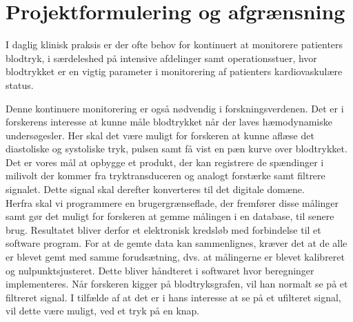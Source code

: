 \chapter{Projektformulering og afgrænsning}
I daglig klinisk praksis er der ofte behov for kontinuert at monitorere patienters blodtryk, i særdeleshed på intensive afdelinger samt operationsstuer, hvor blodtrykket er en vigtig parameter i monitorering af patienters kardiovaskulære status.


Denne kontinuere monitorering er også nødvendig i forskningsverdenen. Det er i forskerens interesse at kunne måle blodtrykket når der laves hæmodynamiske undersøgesler. Her skal det være muligt for forskeren at kunne aflæse det diastoliske og systoliske tryk, pulsen samt få vist en pæn kurve over blodtrykket. Det er vores mål at opbygge et produkt, der kan registrere de spændinger i milivolt der kommer fra tryktransduceren og analogt forstærke samt filtrere signalet. Dette signal skal derefter konverteres til det digitale domæne. \\
Herfra skal vi programmere en brugergrænseflade, der fremfører disse målinger samt gør det muligt for forskeren at gemme målingen i en database, til senere brug. Resultatet bliver derfor et elektronisk kredsløb med forbindelse til et software program.
For at de gemte data kan sammenlignes, kræver det at de alle er blevet gemt med samme forudsætning, dvs. at målingerne er blevet kalibreret og nulpunktsjusteret. Dette bliver håndteret i softwaret hvor beregninger implementeres. Når forskeren kigger på blodtryksgrafen, vil han normalt se på et filtreret signal. I tilfælde af at det er i hans interesse at se på et ufilteret signal, vil dette være muligt, ved et tryk på en knap.

